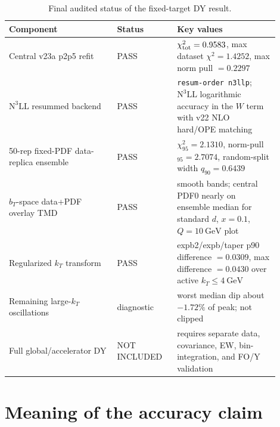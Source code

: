 \documentclass[11pt]{article}
\newcommand{\bt}{b_T}
\newcommand{\kt}{k_T}
\newcommand{\chisq}{\chi^2}
\newcommand{\GeV}{\mathrm{GeV}}
\newcommand{\NthreeLL}{\mathrm{N^{3}LL}}
\newcommand{\code}[1]{\texttt{#1}}
\begin{document}
\begin{table}[H]
\centering
\caption{Final audited status of the fixed-target DY result.}
\label{tab:summary}
\begin{tabular}{p{0.36\linewidth}p{0.20\linewidth}p{0.34\linewidth}}
\toprule
Component & Status & Key values \\
\midrule
Central v23a p2p5 refit & PASS & $\chisq_{\rm tot}=0.9583$, max dataset $\chisq=1.4252$, max norm pull $=0.2297$ \\
$\NthreeLL$ resummed backend & PASS & \code{resum-order n3llp}; $\NthreeLL$ logarithmic accuracy in the $W$ term with v22 NLO hard/OPE matching \\
50-rep fixed-PDF data-replica ensemble & PASS & $\chisq_{95}=2.1310$, norm-pull$_{95}=2.7074$, random-split width $q_{90}=0.6439$ \\
$\bt$-space data+PDF overlay TMD & PASS & smooth bands; central PDF0 nearly on ensemble median for standard $d$, $x=0.1$, $Q=10~\GeV$ plot \\
Regularized $\kt$ transform & PASS & expb2/expb/taper p90 difference $=0.0309$, max difference $=0.0430$ over active $\kt\le4~\GeV$ \\
Remaining large-$\kt$ oscillations & diagnostic & worst median dip about $-1.72\%$ of peak; not clipped \\
Full global/accelerator DY & NOT INCLUDED & requires separate data, covariance, EW, bin-integration, and FO/Y validation \\
\bottomrule
\end{tabular}
\end{table}


\section{Meaning of the accuracy claim}
\label{sec:accuracy}
\end{document}
